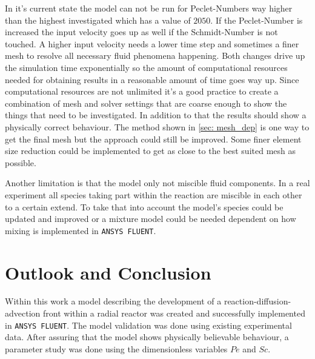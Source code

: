 \documentclass[../thesis.tex]{subfiles}
\begin{document}
In it's current state the model can not be run for Peclet-Numbers way higher than the highest investigated which has a value of $2050$. If the Peclet-Number is increased the input velocity goes up as well if the Schmidt-Number is not touched. A higher input velocity needs a lower time step and sometimes a finer mesh to resolve all necessary fluid phenomena happening. Both changes drive up the simulation time exponentially so the amount of computational resources needed for obtaining results in a reasonable amount of time goes way up. Since computational resources are not unlimited it's a good practice to create a combination of mesh and solver settings that are coarse enough to show the things that need to be investigated. In addition to that the results should show a physically correct behaviour. The method shown in \autoref{sec: mesh_dep} is one way to get the final mesh but the approach could still be improved. Some finer element size reduction could be implemented to get as close to the best suited mesh as possible. 

Another limitation is that the model only not miscible fluid components. In a real experiment all species taking part within the reaction are miscible in each other to a certain extend. To take that into account the model's species could be updated and improved or a mixture model could be needed dependent on how mixing is implemented in \texttt{ANSYS FLUENT}. 

\chapter{Outlook and Conclusion}
\label{chp:out_con}

Within this work a model describing the development of a reaction-diffusion-advection front within a radial reactor was created and successfully implemented in \texttt{ANSYS FLUENT}. The model validation was done using existing experimental data. After assuring that the model shows physically believable behaviour, a parameter study was done using the dimensionless variables $Pe$ and $Sc$. 
\end{document}
